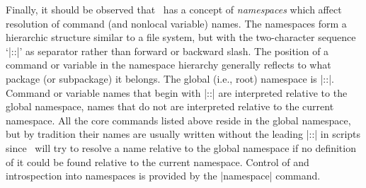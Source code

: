 \documentclass{mtmtcl}
\theoremstyle{plain}
\theoremstyle{remark}
\begin{document}
Finally, it should be observed that \Tcl\ has a concept of 
\emph{namespaces} which affect resolution of command (and nonlocal 
variable) names. The namespaces form a hierarchic structure similar 
to a file system, but with the two-character sequence `|::|' as 
separator rather than forward or backward slash. The position 
of a command or variable in the namespace hierarchy generally 
reflects to what package (or subpackage) it belongs. The global (i.e., 
root) namespace is |::|. Command or variable names that begin with 
|::| are interpreted relative to the global namespace, names that do 
not are interpreted relative to the current namespace. All the core 
commands listed above reside in the global namespace, but by 
tradition their names are usually written without the leading |::| in 
scripts since \Tcl\ will try to resolve a name relative to the global 
namespace if no definition of it could be found relative to the 
current namespace. Control of and introspection into namespaces is 
provided by the |namespace| command.

\end{document}
